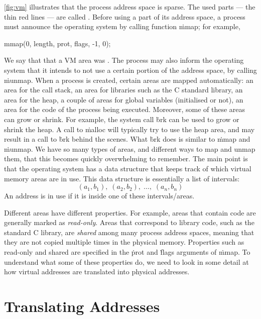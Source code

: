 \autoref{fig:vm} illustrates that the process address space is sparse.
The used parts --- the thin red lines --- are called .
Before using a part of its address space,
  a process must announce the operating system by calling function \.{mmap};
for example,
\begin{ccode}
  mmap(0, length, prot, flags, -1, 0);
\end{ccode}
We say that that a VM area was .
The process may also inform the operating system that it intends
  to not use a certain portion of the address space,
  by calling \.{munmap}.
When a process is created,
  certain areas are mapped automatically:
  an area for the call stack,
  an area for libraries such as the C standard library,
  an area for the heap,
  a couple of areas for global variables (initialised or not),
  an area for the code of the process being executed.
Moreover, some of these areas can grow or shrink.
For example,
  the system call \.{brk} can be used to grow or shrink the heap.
A call to \.{malloc} will typically try to use the heap area,
  and may result in a call to \.{brk} behind the scenes.
What \.{brk} does is similar to \.{mmap} and \.{munmap}.
We have so many types of areas,
  and different ways to map and unmap them,
  that this becomes quickly overwhelming to remember.
The main point is that the operating system has a data structure
  that keeps track of which virtual memory areas are in use.
This data structure is essentially a list of intervals:
\[
  (a_1,b_1),\; (a_2,b_2),\;\ldots,\;(a_n,b_n)
\]
An address is in use if it is inside one of these intervals/areas.

\smallskip

Different areas have different properties.
For example, areas that contain code are generally marked as \emph{read-only}.
Areas that correspond to library code,
  such as the standard C library,
  are \emph{shared} among many process address spaces,
    meaning that they are not copied multiple times in the physical memory.
Properties such as read-only and shared are specified
  in the \.{prot} and \.{flags} arguments of \.{mmap}.
To understand what some of these properties do,
  we need to look in some detail at how virtual addresses
  are translated into physical addresses.

\section{Translating Addresses}

